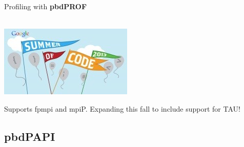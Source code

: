 \begin{frame}[fragile]
\begin{block}{Profiling with \textbf{pbdPROF}}
\begin{minipage}[t]{.4\textwidth}
    \\[.1cm]
    \includegraphics[scale=0.3]{../common/pics/gsoc}
  \end{minipage}
  \centering
  Supports fpmpi and mpiP.  Expanding this fall to include support for TAU!
  \end{block}
\end{frame}

\subsection{pbdPAPI}

